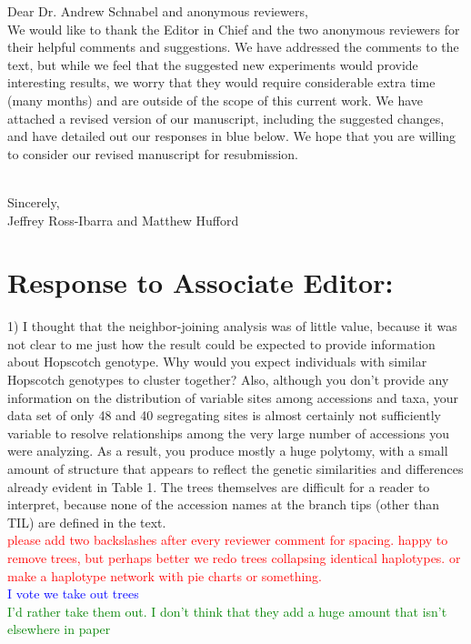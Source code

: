 \documentclass[11pt]{article}
\newcommand{\res}[1]{\noindent \textcolor{blue}{{#1}} \\}
\newcommand{\jri}[1]{\noindent \textcolor{red}{{#1}} \\}
\newcommand{\lev}[1]{\noindent \textcolor{green}{{#1}} \\}
\begin{document}
\noindent Dear Dr. Andrew Schnabel and anonymous reviewers, \\

We would like to thank the Editor in Chief and the two anonymous reviewers for their helpful comments and suggestions. We have addressed the comments to the text, but while we feel that the suggested new experiments would provide interesting results, we worry that they would require considerable extra time (many months) and are outside of the scope of this current work.  We have attached a revised version of our manuscript, including the suggested changes, and have detailed out our responses in blue below. We hope that you are willing to consider our revised manuscript for resubmission.\\\

\noindent Sincerely,\\

Jeffrey Ross-Ibarra and Matthew Hufford

\section*{Response to Associate Editor:}


1) I thought that the neighbor-joining analysis was of little value, because it was not clear to me just how the result could be expected to provide information about Hopscotch genotype.  Why would you expect individuals with similar Hopscotch genotypes to cluster together?  Also, although you don’t provide any information on the distribution of variable sites among accessions and taxa, your data set of only 48 and 40 segregating sites is almost certainly not sufficiently variable to resolve relationships among the very large number of accessions you were analyzing.  As a result, you produce mostly a huge polytomy, with a small amount of structure that appears to reflect the genetic similarities and differences already evident in Table 1.  The trees themselves are difficult for a reader to interpret, because none of the accession names at the branch tips (other than TIL) are defined in the text.\\

\jri{please add two backslashes after every reviewer comment for spacing. happy to remove trees, but perhaps better we redo trees collapsing identical haplotypes. or  make a haplotype network with pie charts or something.}
\res{I vote we take out trees}
\lev{I'd rather take them out. I don't think that they add a huge amount that isn't elsewhere in paper}
\end{document}
